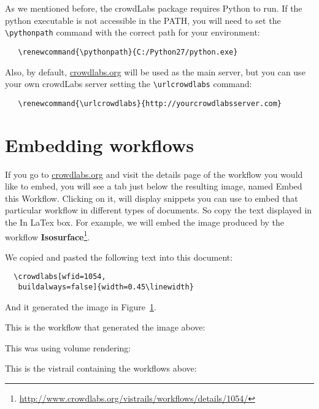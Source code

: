 \documentclass{article}
\begin{document}
As we mentioned before, the crowdLabs package requires Python to
run. If the python executable is not accessible in the PATH, you will
need to set the \texttt{\textbackslash pythonpath} command with the correct path for your environment:
 
\begin{verbatim}
   \renewcommand{\pythonpath}{C:/Python27/python.exe}
\end{verbatim}

Also, by default, \url{crowdlabs.org} will be used as the main server, but
you can use your own crowdLabs server setting the \texttt{\textbackslash urlcrowdlabs} command: 
\begin{verbatim}
   \renewcommand{\urlcrowdlabs}{http://yourcrowdlabsserver.com}
\end{verbatim}

\section{Embedding workflows}
If you go to \url{crowdlabs.org} and visit the details page of the
workflow you would like to embed, you will see a tab just below the
resulting image, named \textsf{Embed this Workflow}. Clicking on it,
will display snippets you can use to embed that particular workflow in
different types of documents. So copy the text displayed in the
\textsf{In LaTex} box. For example, we will embed the image produced
by the workflow
\textbf{Isosurface}\footnote{\url{http://www.crowdlabs.org/vistrails/workflows/details/1054/}}.

We copied and pasted the following text into this document:
\begin{verbatim}
  \crowdlabs[wfid=1054,
   buildalways=false]{width=0.45\linewidth}
\end{verbatim}

And it generated the image in Figure~\ref{fig:isosurface}.
\begin{figure}
\begin{center}
\end{center}
\label{fig:isosurface}
\end{figure}

This is the workflow that generated the image above:\\

\vspace{1.0cm}
This was using volume rendering:\\

This is the vistrail containing the workflows above:\\

\end{document}

